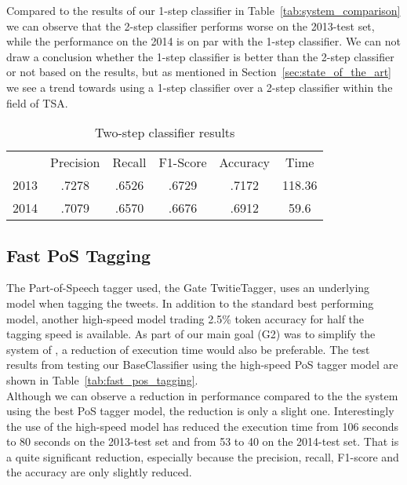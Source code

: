 Compared to the results of our 1-step classifier in Table~\ref{tab:system_comparison} we can observe that the 2-step classifier performs worse on the 2013-test set, while the performance on the 2014 is on par with the 1-step classifier. We can not draw a conclusion whether the 1-step classifier is better than the 2-step classifier or not based on the results, but as mentioned in Section~\ref{sec:state_of_the_art} we see a trend towards using a 1-step classifier over a 2-step classifier within the field of TSA. 

\begin{table}[t]
    \centering
    \begin{tabular}{l|c|c|c|c|c|}
        \cline{2-6}
        & Precision & Recall & F1-Score & Accuracy & Time \\
        \cline{1-6}
        \multirow{1}{*}{2013} & .7278  & .6526 &  .6729 &  .7172 &  118.36 \\
        \cline{1-6}
        
        \multirow{1}{*}{2014} & .7079  & .6570 &  .6676 &  .6912 &  59.6 \\
        \cline{1-6}
    \end{tabular}
    \caption{Two-step classifier results}
    \label{tab:2_step_classifier}   
\end{table}

\subsection{Fast PoS Tagging}
The Part-of-Speech tagger used, the Gate TwitieTagger, uses an underlying model when tagging the tweets. In addition to the standard best performing model, another high-speed model trading 2.5\% token accuracy for half the tagging speed is available. As part of our main goal (G2) was to simplify the system of \cite{FaretReitan}, a reduction of execution time would also be preferable. The test results from testing our BaseClassifier using the high-speed PoS tagger model are shown in Table~\ref{tab:fast_pos_tagging}. \\

Although we can observe a reduction in performance compared to the the system using the best PoS tagger model, the reduction is only a slight one. Interestingly the use of the high-speed model has reduced the execution time from 106 seconds to 80 seconds on the 2013-test set and from 53 to 40 on the 2014-test set. That is a quite significant reduction, especially because the precision, recall, F1-score and the accuracy are only slightly reduced.  

